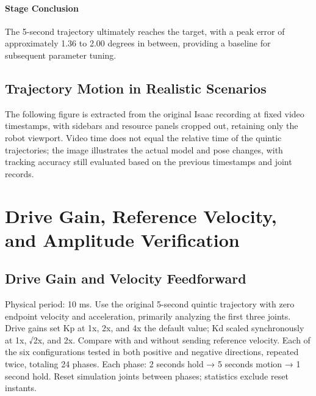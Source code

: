 \paragraph{Stage Conclusion} The 5-second trajectory ultimately reaches the target, with a peak error of approximately 1.36 to 2.00 degrees in between, providing a baseline for subsequent parameter tuning.



\subsection{Trajectory Motion in Realistic Scenarios}
The following figure is extracted from the original Isaac recording at fixed video timestamps, with sidebars and resource panels cropped out, retaining only the robot viewport. Video time does not equal the relative time of the quintic trajectories; the image illustrates the actual model and pose changes, with tracking accuracy still evaluated based on the previous timestamps and joint records.



\FloatBarrier

\section{Drive Gain, Reference Velocity, and Amplitude Verification}

\label{stage:s04}

\subsection{Drive Gain and Velocity Feedforward}\label{s04-detail-1}

Physical period: 10 ms. Use the original 5-second quintic trajectory with zero endpoint velocity and acceleration, primarily analyzing the first three joints. Drive gains set Kp at 1x, 2x, and 4x the default value; Kd scaled synchronously at 1x, √2x, and 2x. Compare with and without sending reference velocity. Each of the six configurations tested in both positive and negative directions, repeated twice, totaling 24 phases. Each phase: 2 seconds hold → 5 seconds motion → 1 second hold. Reset simulation joints between phases; statistics exclude reset instants.

